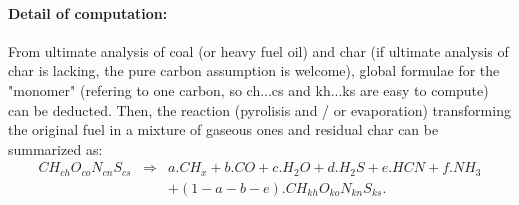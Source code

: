 \paragraph{Detail of computation:}
From ultimate analysis of coal (or heavy fuel oil) and char (if ultimate
analysis of char is lacking, the pure carbon assumption is welcome), global
formulae for the "monomer" (refering to one carbon, so ch...cs and kh...ks are
easy to compute) can be deducted. Then, the reaction (pyrolisis and / or
evaporation) transforming the original fuel in a mixture of gaseous ones and
residual char can be summarized as:
\begin{eqnarray*}
CH_{ch}O_{co}N_{cn}S_{cs} & \Rightarrow & a . CH_{x} + b . CO + c . H_{2}O + d . H_{2}S + e . HCN + f . NH_{3} \\
                          &             & + (1-a-b-e) . CH_{kh}O_{ko}N_{kn}S_{ks}.
\end{eqnarray*}

